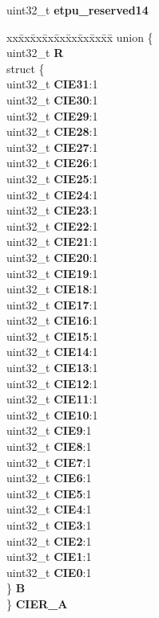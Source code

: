 \begin{DoxyCompactItemize}
\begin{tabbing}
\end{tabbing}\item 
\mbox{\label{structETPU__tag_a38886893bed733df7deca9e6930c75d8}} 
uint32\+\_\+t {\bfseries etpu\+\_\+reserved14}
\item 
\mbox{\label{structETPU__tag_ad3617a3c0aa0f7cf58bcfbaeacc46582}} 
\begin{tabbing}
xx\=xx\=xx\=xx\=xx\=xx\=xx\=xx\=xx\=\kill
union \{\\
\>uint32\_t {\bfseries R}\\
\>struct \{\\
\>\>uint32\_t {\bfseries CIE31}:1\\
\>\>uint32\_t {\bfseries CIE30}:1\\
\>\>uint32\_t {\bfseries CIE29}:1\\
\>\>uint32\_t {\bfseries CIE28}:1\\
\>\>uint32\_t {\bfseries CIE27}:1\\
\>\>uint32\_t {\bfseries CIE26}:1\\
\>\>uint32\_t {\bfseries CIE25}:1\\
\>\>uint32\_t {\bfseries CIE24}:1\\
\>\>uint32\_t {\bfseries CIE23}:1\\
\>\>uint32\_t {\bfseries CIE22}:1\\
\>\>uint32\_t {\bfseries CIE21}:1\\
\>\>uint32\_t {\bfseries CIE20}:1\\
\>\>uint32\_t {\bfseries CIE19}:1\\
\>\>uint32\_t {\bfseries CIE18}:1\\
\>\>uint32\_t {\bfseries CIE17}:1\\
\>\>uint32\_t {\bfseries CIE16}:1\\
\>\>uint32\_t {\bfseries CIE15}:1\\
\>\>uint32\_t {\bfseries CIE14}:1\\
\>\>uint32\_t {\bfseries CIE13}:1\\
\>\>uint32\_t {\bfseries CIE12}:1\\
\>\>uint32\_t {\bfseries CIE11}:1\\
\>\>uint32\_t {\bfseries CIE10}:1\\
\>\>uint32\_t {\bfseries CIE9}:1\\
\>\>uint32\_t {\bfseries CIE8}:1\\
\>\>uint32\_t {\bfseries CIE7}:1\\
\>\>uint32\_t {\bfseries CIE6}:1\\
\>\>uint32\_t {\bfseries CIE5}:1\\
\>\>uint32\_t {\bfseries CIE4}:1\\
\>\>uint32\_t {\bfseries CIE3}:1\\
\>\>uint32\_t {\bfseries CIE2}:1\\
\>\>uint32\_t {\bfseries CIE1}:1\\
\>\>uint32\_t {\bfseries CIE0}:1\\
\>\} {\bfseries B}\\
\} {\bfseries CIER\_A}\\


\end{tabbing}
\end{DoxyCompactItemize}
